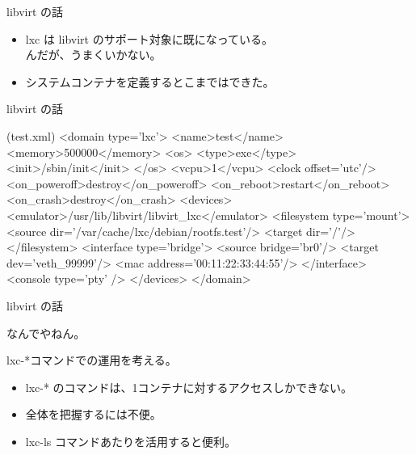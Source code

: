\begin{frame}{libvirt の話}
\begin{itemize}
\item lxc は libvirt のサポート対象に既になっている。\\
      んだが、うまくいかない。
\item システムコンテナを定義するとこまではできた。
\end{itemize}
\end{frame}


\begin{frame}[containsverbatim]{libvirt の話}
\begin{commandline}
(test.xml)
<domain type='lxc'>
  <name>test</name>
  <memory>500000</memory>
  <os>
     <type>exe</type>
     <init>/sbin/init</init>
  </os>
  <vcpu>1</vcpu>
  <clock offset='utc'/>
  <on_poweroff>destroy</on_poweroff>
  <on_reboot>restart</on_reboot>
  <on_crash>destroy</on_crash>
  <devices>
     <emulator>/usr/lib/libvirt/libvirt_lxc</emulator>
     <filesystem type='mount'>
       <source dir='/var/cache/lxc/debian/rootfs.test'/>
       <target dir='/'/>
     </filesystem>
     <interface type='bridge'>
       <source bridge='br0'/>
       <target dev='veth_99999'/>
       <mac address='00:11:22:33:44:55'/>
     </interface>
     <console type='pty' />
  </devices>
</domain>
\end{commandline}
\end{frame}

\begin{frame}[containsverbatim]{libvirt の話}
なんでやねん。
\end{frame}

\begin{frame}[containsverbatim]{lxc-*コマンドでの運用を考える。}
\begin{itemize}
\item lxc-* のコマンドは、1コンテナに対するアクセスしかできない。
\item 全体を把握するには不便。
\item lxc-ls コマンドあたりを活用すると便利。
\end{itemize}
\end{frame}

